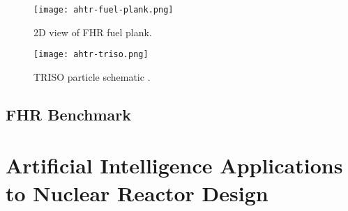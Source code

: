 \begin{figure}[]
    \centering
    \texttt{[image: ahtr-fuel-plank.png]} 
    \caption{2D view of FHR fuel plank.}
    \label{fig:ahtr-fuel-plank}
\end{figure}

\begin{figure}[]
    \centering
    \texttt{[image: ahtr-triso.png]} 
    \caption{TRISO particle schematic \cite{noauthor_fluoride_nodate}.}
    \label{fig:ahtr-triso}
\end{figure}


\subsection{FHR Benchmark}

\section{Artificial Intelligence Applications to Nuclear Reactor Design}